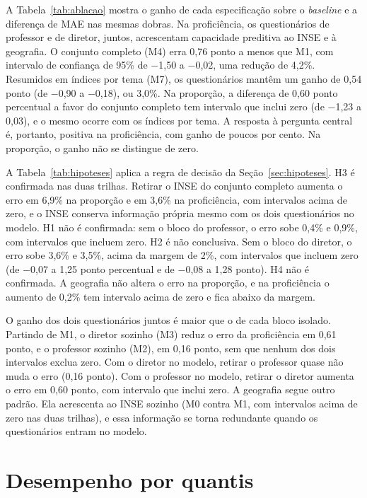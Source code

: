 A Tabela~\ref{tab:ablacao} mostra o ganho de cada especificação sobre o
\textit{baseline} e a diferença de MAE nas mesmas dobras. Na proficiência,
os questionários de professor e de diretor, juntos, acrescentam
capacidade preditiva ao INSE e à geografia. O conjunto completo (M4) erra
0,76 ponto a menos que M1, com intervalo de confiança de 95\% de $-$1,50 a
$-$0,02, uma redução de 4,2\%. Resumidos em índices por tema (M7), os
questionários mantêm um ganho de 0,54 ponto (de $-$0,90 a $-$0,18), ou
3,0\%. Na proporção, a diferença de 0,60 ponto percentual a favor do
conjunto completo tem intervalo que inclui zero (de $-$1,23 a 0,03), e o
mesmo ocorre com os índices por tema. A resposta à pergunta central é,
portanto, positiva na proficiência, com ganho de poucos por cento. Na
proporção, o ganho não se distingue de zero.



A Tabela~\ref{tab:hipoteses} aplica a regra de decisão da
Seção~\ref{sec:hipoteses}. H3 é confirmada nas duas trilhas. Retirar o
INSE do conjunto completo aumenta o erro em 6,9\% na proporção e em 3,6\%
na proficiência, com intervalos acima de zero, e o INSE conserva
informação própria mesmo com os dois questionários no modelo. H1 não é
confirmada: sem o bloco do professor, o erro sobe 0,4\% e 0,9\%, com
intervalos que incluem zero. H2 é não conclusiva. Sem o bloco do diretor, o
erro sobe 3,6\% e 3,5\%, acima da margem de 2\%, com intervalos que incluem
zero (de $-$0,07 a 1,25 ponto percentual e de $-$0,08 a 1,28 ponto). H4 não
é confirmada. A geografia não altera o erro na proporção, e na
proficiência o aumento de 0,2\% tem intervalo acima de zero e fica abaixo
da margem.



O ganho dos dois questionários juntos é maior que o de cada bloco isolado.
Partindo de M1, o diretor sozinho (M3) reduz o erro da proficiência em 0,61
ponto, e o professor sozinho (M2), em 0,16 ponto, sem que nenhum dos dois
intervalos exclua zero. Com o diretor no modelo, retirar o professor quase
não muda o erro (0,16 ponto). Com o professor no modelo, retirar o diretor
aumenta o erro em 0,60 ponto, com intervalo que inclui zero. A geografia
segue outro padrão. Ela acrescenta ao INSE sozinho (M0 contra M1, com
intervalos acima de zero nas duas trilhas), e essa informação se torna
redundante quando os questionários entram no modelo.

\section{Desempenho por quantis}
\label{sec:res-quantis}

